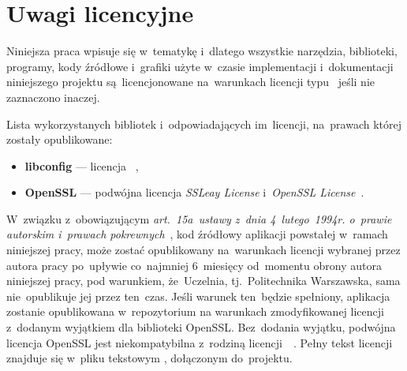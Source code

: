 \documentclass[thesis]{subfiles}
\begin{document}

\section{Uwagi licencyjne}

Niniejsza praca wpisuje się w~tematykę  i~dlatego wszystkie narzędzia, biblioteki, programy, kody źródłowe i~grafiki użyte w~czasie implementacji i~dokumentacji niniejszego projektu są~licencjonowane na~warunkach licencji typu~ jeśli nie zaznaczono inaczej.

Lista wykorzystanych bibliotek i~odpowiadających im~licencji, na~prawach której zostały opublikowane:
\begin{itemize}
\item \textbf{libconfig} --- licencja ~\cite{libconfig-webpage},
\item \textbf{OpenSSL} --- podwójna licencja \emph{SSLeay License} i~\emph{OpenSSL License}~\cite{openssl-license}.
\end{itemize}

W~związku z~obowiązującym \emph{art.~15a~ustawy z~dnia 4~lutego~1994r. o~prawie autorskim i~prawach pokrewnych}~\cite{papp}, kod źródłowy aplikacji powstałej w~ramach niniejszej pracy, może zostać opublikowany na~warunkach licencji wybranej przez autora pracy po~upływie co~najmniej 6~miesięcy od~momentu obrony autora niniejszej pracy, pod warunkiem, że~Uczelnia, tj.~Politechnika Warszawska, sama nie~opublikuje jej przez ten~czas. Jeśli warunek ten~będzie spełniony, aplikacja zostanie opublikowana w~repozytorium  na warunkach zmodyfikowanej licencji  z~dodanym wyjątkiem dla biblioteki OpenSSL. Bez~dodania wyjątku, podwójna licencja OpenSSL jest niekompatybilna z~rodziną licencji~~\cite{openssl-license-incompatibility,openssl-license-incompatibility-2}. Pełny tekst licencji znajduje się w~pliku tekstowym , dołączonym do~projektu.
\end{document}

